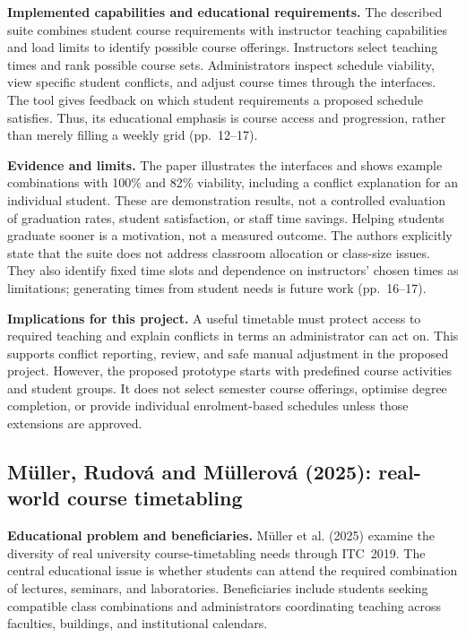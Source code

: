\documentclass[
  11pt,a4paper,oneside]{report}
\begin{document}
\textbf{Implemented capabilities and educational requirements.} The described suite combines student course requirements with instructor teaching capabilities and load limits to identify possible course offerings. Instructors select teaching times and rank possible course sets. Administrators inspect schedule viability, view specific student conflicts, and adjust course times through the interfaces. The tool gives feedback on which student requirements a proposed schedule satisfies. Thus, its educational emphasis is course access and progression, rather than merely filling a weekly grid (pp.~12--17).

\textbf{Evidence and limits.} The paper illustrates the interfaces and shows example combinations with 100\% and 82\% viability, including a conflict explanation for an individual student. These are demonstration results, not a controlled evaluation of graduation rates, student satisfaction, or staff time savings. Helping students graduate sooner is a motivation, not a measured outcome. The authors explicitly state that the suite does not address classroom allocation or class-size issues. They also identify fixed time slots and dependence on instructors' chosen times as limitations; generating times from student needs is future work (pp.~16--17).

\textbf{Implications for this project.} A useful timetable must protect access to required teaching and explain conflicts in terms an administrator can act on. This supports conflict reporting, review, and safe manual adjustment in the proposed project. However, the proposed prototype starts with predefined course activities and student groups. It does not select semester course offerings, optimise degree completion, or provide individual enrolment-based schedules unless those extensions are approved.

\subsection{Müller, Rudová and Müllerová (2025): real-world course timetabling}
\textbf{Educational problem and beneficiaries.} Müller et al. (2025) examine the diversity of real university course-timetabling needs through ITC~2019. The central educational issue is whether students can attend the required combination of lectures, seminars, and laboratories. Beneficiaries include students seeking compatible class combinations and administrators coordinating teaching across faculties, buildings, and institutional calendars.
\end{document}
